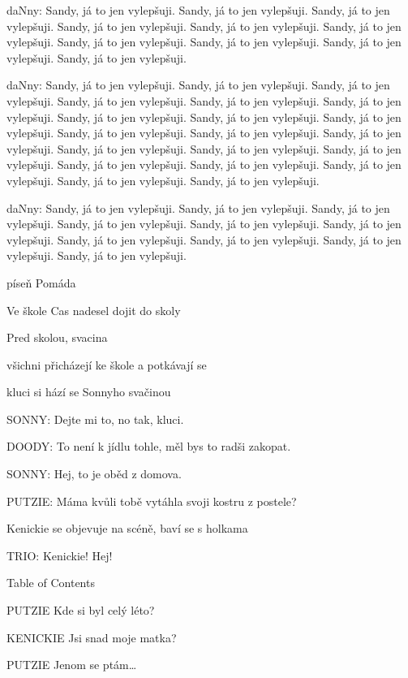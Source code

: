 
\rep daNny: Sandy, já to jen vylepšuji. Sandy, já to jen vylepšuji. Sandy, já to jen vylepšuji. Sandy, já to jen vylepšuji. Sandy, já to jen vylepšuji. Sandy, já to jen vylepšuji. Sandy, já to jen vylepšuji. Sandy, já to jen vylepšuji. Sandy, já to jen vylepšuji. Sandy, já to jen vylepšuji. 

\rep daNny: Sandy, já to jen vylepšuji. Sandy, já to jen vylepšuji. Sandy, já to jen vylepšuji. Sandy, já to jen vylepšuji. Sandy, já to jen vylepšuji. Sandy, já to jen vylepšuji. Sandy, já to jen vylepšuji. Sandy, já to jen vylepšuji. Sandy, já to jen vylepšuji. Sandy, já to jen vylepšuji. 
Sandy, já to jen vylepšuji. Sandy, já to jen vylepšuji. Sandy, já to jen vylepšuji. Sandy, já to jen vylepšuji. Sandy, já to jen vylepšuji.
Sandy, já to jen vylepšuji. Sandy, já to jen vylepšuji. Sandy, já to jen vylepšuji. Sandy, já to jen vylepšuji. Sandy, já to jen vylepšuji.

\rep daNny: Sandy, já to jen vylepšuji. Sandy, já to jen vylepšuji. Sandy, já to jen vylepšuji. Sandy, já to jen vylepšuji. Sandy, já to jen vylepšuji. Sandy, já to jen vylepšuji. Sandy, já to jen vylepšuji. Sandy, já to jen vylepšuji. Sandy, já to jen vylepšuji. Sandy, já to jen vylepšuji. 

\pop píseň Pomáda

\act Ve škole
Cas nadesel dojit do skoly

\scene Pred skolou, svacina

\pop všichni přicházejí ke škole a potkávají se

\pop kluci si hází se Sonnyho svačinou

\rep SONNY:        Dejte mi to, no tak, kluci.

\rep DOODY:        To není k jídlu tohle, měl bys to radši zakopat.

\rep SONNY:        Hej, to je oběd z domova.

\rep PUTZIE:        Máma kvůli tobě vytáhla svoji kostru z postele?

\pop Kenickie se objevuje na scéně, baví se s holkama

\rep TRIO:        Kenickie! Hej!

\nonum\notoc\sec Table of Contents
\maketoc

\bye
PUTZIE        Kde si byl celý léto?

KENICKIE        Jsi snad moje matka?

PUTZIE        Jenom se ptám…

